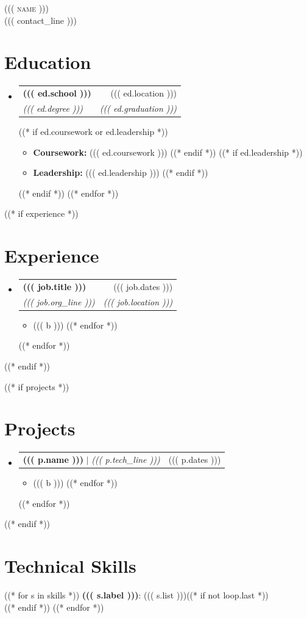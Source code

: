 \documentclass[letterpaper,11pt]{article}
\makeatletter
\newcommand{\resumeItem}[1]{\item\small{#1 \vspace{-2pt}}}
\newcommand{\resumeSubheading}[4]{
  \vspace{-2pt}\item
    \begin{tabular*}{0.97\textwidth}[t]{l@{\extracolsep{\fill}}r}
      \textbf{#1} & #2 \\
      \textit{\small#3} & \textit{\small #4} \\
    \end{tabular*}\vspace{-7pt}
}
\newcommand{\resumeProjectHeading}[2]{
    \item
    \begin{tabular*}{0.97\textwidth}{l@{\extracolsep{\fill}}r}
      \small#1 & #2 \\
    \end{tabular*}\vspace{-7pt}
}
\newcommand{\resumeSubHeadingListStart}{\begin{itemize}[leftmargin=0.15in, label={}]}
\newcommand{\resumeSubHeadingListEnd}{\end{itemize}}
\newcommand{\resumeItemListStart}{\begin{itemize}}
\newcommand{\resumeItemListEnd}{\end{itemize}\vspace{-5pt}}
\makeatother
\begin{document}
\begin{center}
    {\Huge \scshape ((( name )))} \\ \vspace{1pt}
    \small ((( contact_line )))
\end{center}

\section{Education}
  \resumeSubHeadingListStart
((* for ed in education *))
    \resumeSubheading{((( ed.school )))}{((( ed.location )))}{((( ed.degree )))}{((( ed.graduation )))}
((* if ed.coursework or ed.leadership *))
      \resumeItemListStart
((* if ed.coursework *))
        \resumeItem{\textbf{Coursework:} ((( ed.coursework )))}
((* endif *))
((* if ed.leadership *))
        \resumeItem{\textbf{Leadership:} ((( ed.leadership )))}
((* endif *))
      \resumeItemListEnd
((* endif *))
((* endfor *))
  \resumeSubHeadingListEnd

((* if experience *))
\section{Experience}
  \resumeSubHeadingListStart
((* for job in experience *))
    \resumeSubheading{((( job.title )))}{((( job.dates )))}{((( job.org_line )))}{((( job.location )))}
      \resumeItemListStart
((* for b in job.bullets *))
        \resumeItem{((( b )))}
((* endfor *))
      \resumeItemListEnd
((* endfor *))
  \resumeSubHeadingListEnd
((* endif *))

((* if projects *))
\section{Projects}
    \resumeSubHeadingListStart
((* for p in projects *))
      \resumeProjectHeading{\textbf{((( p.name )))} $|$ \emph{((( p.tech_line )))}}{((( p.dates )))}
          \resumeItemListStart
((* for b in p.bullets *))
            \resumeItem{((( b )))}
((* endfor *))
          \resumeItemListEnd
((* endfor *))
    \resumeSubHeadingListEnd
((* endif *))

\section{Technical Skills}
 \begin{itemize}[leftmargin=0.15in, label={}]
    \small{\item{
((* for s in skills *))
     \textbf{((( s.label )))}: ((( s.list )))((* if not loop.last *)) \\((* endif *))
((* endfor *))
    }}
 \end{itemize}
\end{document}
